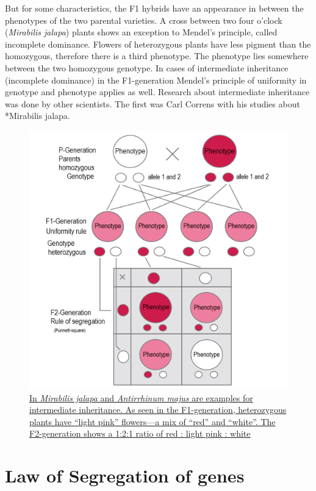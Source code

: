 But for some characteristics, the F1 hybrids have an appearance in between the phenotypes of the two parental varieties. A cross between two four o'clock (\emph{Mirabilis jalapa}) plants shows an exception to Mendel's principle, called incomplete dominance. Flowers of heterozygous plants have less pigment than the homozygous, therefore there is a third phenotype. The phenotype lies somewhere between the two homozygous genotype. In cases of intermediate inheritance (incomplete dominance) in the F1-generation Mendel's principle of uniformity in genotype and phenotype applies as well. Research about intermediate inheritance was done by other scientists. The first was Carl Correns with his studies about *Mirabilis jalapa.



\begin{figure}

{\centering \includegraphics[width=0.7\linewidth]{./figures/mendel/Intermediate_inheritance_P_-_F1_-_F2} 

}

\caption{\href{https://commons.wikimedia.org/wiki/File:Intermediate_inheritance_P_-_F1_-_F2.png}{In \emph{Mirabilis jalapa} and \emph{Antirrhinum majus} are examples for intermediate inheritance. As seen in the F1-generation, heterozygous plants have ``light pink'' flowers---a mix of ``red'' and ``white''. The F2-generation shows a 1:2:1 ratio of red : light pink : white}}\label{fig:intermediateinheritance}
\end{figure}

\hypertarget{law-of-segregation-of-genes}{%
\section{Law of Segregation of genes}\label{law-of-segregation-of-genes}}

